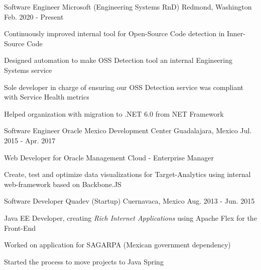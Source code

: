 

\begin{cventries}

  \cventry
    {Software Engineer} %
    {Microsoft (Engineering Systems RnD)} %
    {Redmond, Washington} %
    {Feb. 2020 - Present} %
    {
      \begin{cvitems} %
        \item {Continuously improved internal tool for Open-Source Code detection in Inner-Source Code}
        \item {Designed automation to make OSS Detection tool an internal Engineering Systems service}
        \item {Sole developer in charge of ensuring our OSS Detection service was compliant with Service Health metrics}
        \item {Helped organization with migration to .NET 6.0 from NET Framework}  
      \end{cvitems}
    }

  \cventry
    {Software Engineer} %
    {Oracle Mexico Development Center} %
    {Guadalajara, Mexico} %
    {Jul. 2015 - Apr. 2017} %
    {
        \begin{cvitems}
            \item {Web Developer for Oracle Management Cloud - Enterprise Manager}
            \item {Create, test and optimize data visualizations for Target-Analytics using internal web-framework based on Backbone.JS }
        \end{cvitems}
    }

\cventry
{Software Developer} %
{Quadev (Startup)} %
{Cuernavaca, Mexico} %
{Aug. 2013 - Jun. 2015} %
{
    \begin{cvitems}
        \item {Java EE Developer, creating \textit{Rich Internet Applications} using Apache Flex for the Front-End}
        \item {Worked on application for SAGARPA (Mexican government dependency)}
        \item {Started the process to move projects to Java Spring}
    \end{cvitems}
}

\end{cventries}